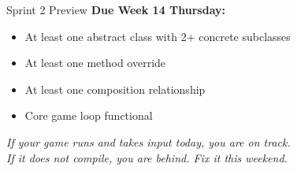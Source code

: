 \documentclass{beamer}
\begin{document}
\begin{frame}{Sprint 2 Preview}
\textbf{Due Week 14 Thursday:}
\vspace{0.2cm}
\begin{itemize}
  \item At least one abstract class with 2+ concrete subclasses
  \item At least one method override
  \item At least one composition relationship
  \item Core game loop functional
\end{itemize}
\vspace{0.3cm}
\textit{If your game runs and takes input today, you are on track.}\\
\textit{If it does not compile, you are behind. Fix it this weekend.}
\end{frame}
\end{document}
